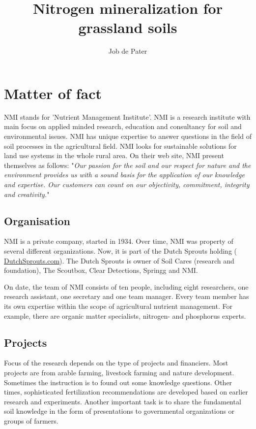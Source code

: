 \documentclass[10pt,twoside,dutch,english]{report}
\author{Job de Pater}
\title{Nitrogen mineralization for grassland soils } %
\begin{document}
\setcounter{tocdepth}{1}

\tableofcontents


\section{Matter of fact}
NMI stands for 'Nutrient Management Institute'. NMI is a research institute with main focus on applied minded research, education and consultancy for soil and environmental issues. NMI has unique expertise to answer questions in the field of soil processes in the agricultural field. NMI looks for sustainable solutions for land use systems in the whole rural area. 
On their web site, NMI present themselves as follows: "\textit{Our passion for the soil and our respect for nature and the environment provides
us with a sound basis for the application of our knowledge and expertise. Our customers can count on our objectivity, commitment, integrity and creativity.}"
\subsection{Organisation}
NMI is a private company, started in 1934. Over time, NMI was property of several different organizations. Now, it is part of the Dutch Sprouts holding (\href{http://www.dutchsprouts.com/}{ DutchSprouts.com}). The Dutch Sprouts is owner of Soil Cares (research and foundation), The Scoutbox, Clear Detections, Springg and NMI. 

On date, the team of NMI consists of ten people, including eight researchers, one research assistant, one secretary and one team manager. Every team member has its own expertise within the scope of agricultural nutrient management. For example, there are organic matter specialists, nitrogen- and phosphorus experts.

\subsection{Projects}
Focus of the research depends on the type of projects and financiers. Most projects are from arable farming, livestock farming and nature development. Sometimes the instruction is to found out some knowledge questions. Other times, sophisticated fertilization recommendations are developed based on earlier research and experiments. Another important task is to share the fundamental soil knowledge in the form of presentations to governmental organizations or groups of farmers. 
\end{document}
